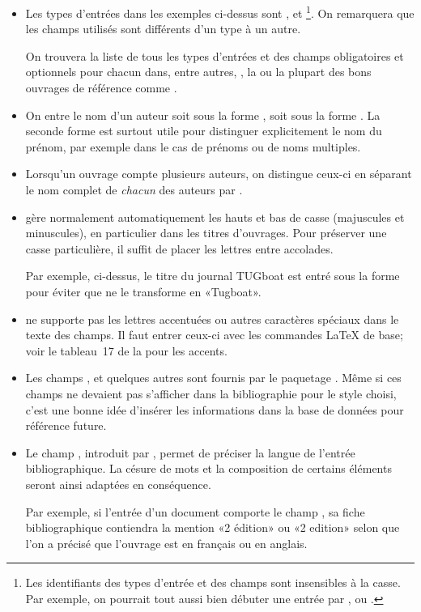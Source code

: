 \begin{itemize}
\item Les types d'entrées dans les exemples ci-dessus sont
  ,  et \footnote{%
    Les identifiants des types d'entrée et des champs sont insensibles
    à la casse. Par exemple, on pourrait tout aussi bien débuter une
    entrée par ,  ou .}. %
  On remarquera que les champs utilisés sont différents d'un type à un
  autre.

  On trouvera la liste de tous les types d'entrées et des champs
  obligatoires et optionnels pour chacun dans, entre autres, %
  , %
  la  %
  ou la plupart des bons ouvrages de référence comme
  \citet{Kopka:latex:4e}.
\item On entre le nom d'un auteur soit sous la forme , soit sous la forme . La seconde
  forme est surtout utile pour distinguer explicitement le nom du
  prénom, par exemple dans le cas de prénoms ou de noms multiples.
\item Lorsqu'un ouvrage compte plusieurs auteurs, on distingue ceux-ci
  en séparant le nom complet de \emph{chacun} des auteurs par
  .
\item {\BibTeX} gère normalement automatiquement les hauts et bas de
  casse (majuscules et minuscules), en particulier dans les titres
  d'ouvrages. Pour préserver une casse particulière, il suffit de
  placer les lettres entre accolades.

  Par exemple, ci-dessus, le titre du journal TUGboat est entré sous
  la forme  pour éviter que {\BibTeX} ne le
  transforme en «Tugboat».
\item {\BibTeX} ne supporte pas les lettres accentuées ou autres
  caractères spéciaux dans le texte des champs. Il faut entrer ceux-ci
  avec les commandes {\LaTeX} de base; voir %
  le tableau~17 de la %
  pour les accents.
\item Les champs ,  et quelques autres
  \citep[voir][section~2.8]{natbib} sont fournis par le paquetage
  . Même si ces champs ne devaient pas s'afficher dans la
  bibliographie pour le style choisi, c'est une bonne idée d'insérer
  les informations dans la base de données pour référence future.
\item Le champ , introduit par , permet de
  préciser la langue de l'entrée bibliographique. La césure de mots et
  la composition de certains éléments seront ainsi adaptées en
  conséquence.

  Par exemple, si l'entrée d'un document comporte le champ
  , sa fiche bibliographique contiendra la mention
  «2{\ieme} édition» ou «2 edition» selon que l'on a précisé
  que l'ouvrage est en français ou en anglais.
\end{itemize}

